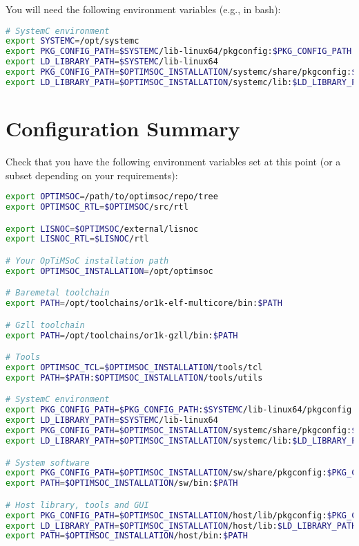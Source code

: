 You will need the following environment variables (e.g., in bash):

\begin{lstlisting}[language=bash]
# SystemC environment
export SYSTEMC=/opt/systemc
export PKG_CONFIG_PATH=$SYSTEMC/lib-linux64/pkgconfig:$PKG_CONFIG_PATH
export LD_LIBRARY_PATH=$SYSTEMC/lib-linux64
export PKG_CONFIG_PATH=$OPTIMSOC_INSTALLATION/systemc/share/pkgconfig:$PKG_CONFIG_PATH
export LD_LIBRARY_PATH=$OPTIMSOC_INSTALLATION/systemc/lib:$LD_LIBRARY_PATH
\end{lstlisting}

\section{Configuration Summary}

Check that you have the following environment variables set at this
point (or a subset depending on your requirements):

\begin{lstlisting}[language=bash]
export OPTIMSOC=/path/to/optimsoc/repo/tree
export OPTIMSOC_RTL=$OPTIMSOC/src/rtl

export LISNOC=$OPTIMSOC/external/lisnoc
export LISNOC_RTL=$LISNOC/rtl

# Your OpTiMSoC installation path
export OPTIMSOC_INSTALLATION=/opt/optimsoc

# Baremetal toolchain
export PATH=/opt/toolchains/or1k-elf-multicore/bin:$PATH

# Gzll toolchain
export PATH=/opt/toolchains/or1k-gzll/bin:$PATH

# Tools
export OPTIMSOC_TCL=$OPTIMSOC_INSTALLATION/tools/tcl
export PATH=$PATH:$OPTIMSOC_INSTALLATION/tools/utils

# SystemC environment
export PKG_CONFIG_PATH=$PKG_CONFIG_PATH:$SYSTEMC/lib-linux64/pkgconfig
export LD_LIBRARY_PATH=$SYSTEMC/lib-linux64
export PKG_CONFIG_PATH=$OPTIMSOC_INSTALLATION/systemc/share/pkgconfig:$PKG_CONFIG_PATH
export LD_LIBRARY_PATH=$OPTIMSOC_INSTALLATION/systemc/lib:$LD_LIBRARY_PATH

# System software
export PKG_CONFIG_PATH=$OPTIMSOC_INSTALLATION/sw/share/pkgconfig:$PKG_CONFIG_PATH
export PATH=$OPTIMSOC_INSTALLATION/sw/bin:$PATH

# Host library, tools and GUI
export PKG_CONFIG_PATH=$OPTIMSOC_INSTALLATION/host/lib/pkgconfig:$PKG_CONFIG_PATH
export LD_LIBRARY_PATH=$OPTIMSOC_INSTALLATION/host/lib:$LD_LIBRARY_PATH
export PATH=$OPTIMSOC_INSTALLATION/host/bin:$PATH
\end{lstlisting}
